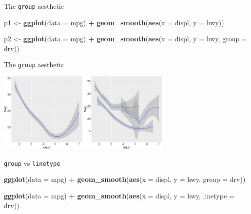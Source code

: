 \documentclass[ignorenonframetext,]{beamer}
\newenvironment{Shaded}{\begin{snugshade}}{\end{snugshade}}
\newcommand{\DataTypeTok}[1]{\textcolor[rgb]{0.13,0.29,0.53}{#1}}
\newcommand{\KeywordTok}[1]{\textcolor[rgb]{0.13,0.29,0.53}{\textbf{#1}}}
\newcommand{\NormalTok}[1]{#1}
\newcommand{\OperatorTok}[1]{\textcolor[rgb]{0.81,0.36,0.00}{\textbf{#1}}}
\newcommand{\StringTok}[1]{\textcolor[rgb]{0.31,0.60,0.02}{#1}}
\begin{document}
\begin{frame}[fragile]{The \texttt{group} aesthetic}
\protect\hypertarget{the-group-aesthetic-1}{}

\begin{Shaded}
\begin{Highlighting}[]
\NormalTok{p1 <-}\StringTok{ }\KeywordTok{ggplot}\NormalTok{(}\DataTypeTok{data =}\NormalTok{ mpg) }\OperatorTok{+}
\StringTok{  }\KeywordTok{geom_smooth}\NormalTok{(}\KeywordTok{aes}\NormalTok{(}\DataTypeTok{x =}\NormalTok{ displ, }\DataTypeTok{y =}\NormalTok{ hwy))}

\NormalTok{p2 <-}\StringTok{ }\KeywordTok{ggplot}\NormalTok{(}\DataTypeTok{data =}\NormalTok{ mpg) }\OperatorTok{+}
\StringTok{  }\KeywordTok{geom_smooth}\NormalTok{(}\KeywordTok{aes}\NormalTok{(}\DataTypeTok{x =}\NormalTok{ displ, }\DataTypeTok{y =}\NormalTok{ hwy, }\DataTypeTok{group =}\NormalTok{ drv))}
\end{Highlighting}
\end{Shaded}

\end{frame}

\begin{frame}{The \texttt{group} aesthetic}
\protect\hypertarget{the-group-aesthetic-2}{}

\begin{center}\includegraphics[height=150px]{data-visualization_files/figure-beamer/unnamed-chunk-31-1} \end{center}

\end{frame}

\begin{frame}[fragile]{\texttt{group} vs \texttt{linetype}}
\protect\hypertarget{group-vs-linetype}{}

\begin{Shaded}
\begin{Highlighting}[]
\KeywordTok{ggplot}\NormalTok{(}\DataTypeTok{data =}\NormalTok{ mpg) }\OperatorTok{+}
\StringTok{  }\KeywordTok{geom_smooth}\NormalTok{(}\KeywordTok{aes}\NormalTok{(}\DataTypeTok{x =}\NormalTok{ displ, }\DataTypeTok{y =}\NormalTok{ hwy, }\DataTypeTok{group =}\NormalTok{ drv))}

\KeywordTok{ggplot}\NormalTok{(}\DataTypeTok{data =}\NormalTok{ mpg) }\OperatorTok{+}
\StringTok{  }\KeywordTok{geom_smooth}\NormalTok{(}\KeywordTok{aes}\NormalTok{(}\DataTypeTok{x =}\NormalTok{ displ, }\DataTypeTok{y =}\NormalTok{ hwy, }\DataTypeTok{linetype =}\NormalTok{ drv))}
\end{Highlighting}
\end{Shaded}

\end{frame}
\end{document}
